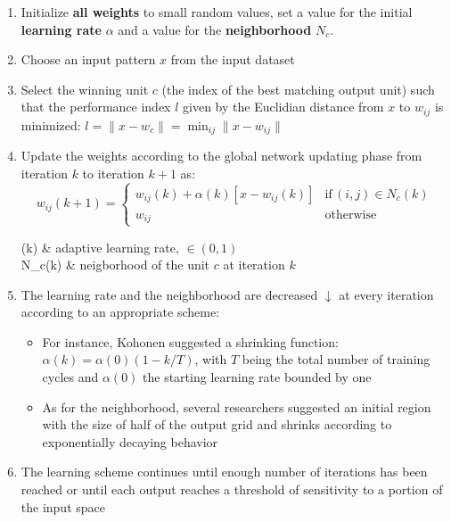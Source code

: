 \documentclass{tron}
\begin{document}
\begin{algo}{}
	\begin{enumerate}
		\item Initialize \textbf{all weights} to small random values, set a value for the initial \textbf{learning rate} $\alpha$ and a value for the \textbf{neighborhood} $N_c$.
		\item Choose an input pattern $x$ from the input dataset
		\item Select the winning unit $c$ (the index of the best matching output unit) such that the performance index $l$ given by the Euclidian distance from $x$ to $w_{ij}$ is minimized: $l = \| x - w_c \| = \min_{ij}\| x - w_{ij}\|$
		\item Update the weights according to the global network updating phase from iteration $k$ to iteration $k+1$ as:
		\begin{equation}
			w_{ij}(k+1) = 
			\begin{cases}
				w_{ij}(k) + \alpha(k) [x - w_{ij}(k)] & \text{if} \, (i,j)\in N_c(k) \\
				w_{ij} & \text{otherwise}
			\end{cases}
		\end{equation}
		\begin{eqconditions}
			\alpha(k) & adaptive learning rate, $\in (0, 1)$ \\
			N_c(k) & neigborhood of the unit $c$ at iteration $k$
		\end{eqconditions}
		\item The learning rate and the neighborhood are decreased $\downarrow$ at every iteration according to an appropriate scheme:
			\begin{itemize}
				\item For instance, Kohonen suggested a shrinking function: $\alpha(k) = \alpha(0) (1 - k/T)$, with $T$ being the total number of training cycles and $\alpha(0)$ the starting learning rate bounded by one
				\item As for the neighborhood, several researchers suggested an initial region with the size of half of the output grid and shrinks according to exponentially decaying behavior
			\end{itemize}
		\item The learning scheme continues until enough number of iterations has been reached or until each output reaches a threshold of sensitivity to a portion of the input space
	\end{enumerate}
\end{algo}
\end{document}
